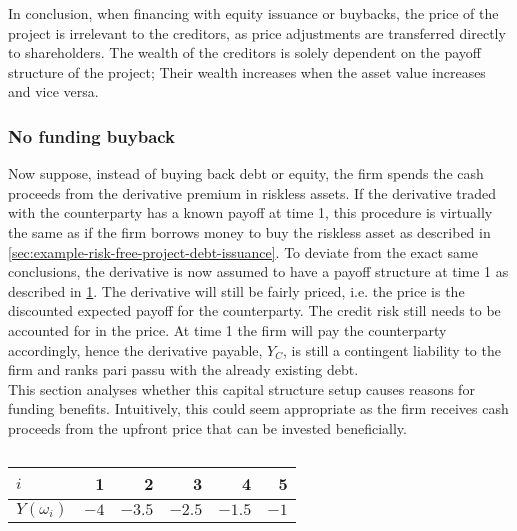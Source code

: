 \documentclass[../main.tex]{subfiles}
\begin{document}
            In conclusion, when financing with equity issuance or buybacks,
            the price of the project is irrelevant to the creditors,
            as price adjustments are transferred directly to shareholders.
            The wealth of the creditors is solely dependent on the payoff structure of the project;
            Their wealth increases when the asset value increases and vice versa.

        \subsubsection{No funding buyback}
            Now suppose, instead of buying back debt or equity, 
            the firm spends the cash proceeds from the derivative premium in riskless assets. 
            If the derivative traded with the counterparty has a known payoff at time 1, this procedure is virtually the same as if the firm borrows money to buy the riskless asset 
            as described in \cref{sec:example-risk-free-project-debt-issuance}. 
            To deviate from the exact same conclusions, the derivative is now assumed to have a payoff structure at time 1 
            as described in \cref{tbl:risky-option-payoff}. 
            The derivative will still be fairly priced, i.e. the price is the discounted expected payoff for the counterparty. 
            The credit risk still needs to be accounted for in the price. 
            At time 1 the firm will pay the counterparty accordingly, hence the derivative payable, $Y_C$, 
            is still a contingent liability to the firm and ranks pari passu with the already existing debt.
            \\
            This section analyses whether this capital structure setup causes reasons for funding benefits.
            Intuitively, this could seem appropriate as the firm receives cash proceeds from the upfront price that can be invested beneficially.
            
            \begin{table}[H]
                \centering
                \begin{tabular}{l|rrrrr}
                    $i$ & 1 & 2 & 3 & 4 & 5 \\
                    \hline
                    $Y(\omega_{i})$ & $\num{-4}$ & $\num{-3.5}$ & $\num{-2.5}$ & $\num{-1.5}$ & $\num{-1}$ \\
                \end{tabular}
                \caption{}
                \label{tbl:risky-option-payoff}
            \end{table}
\end{document}
